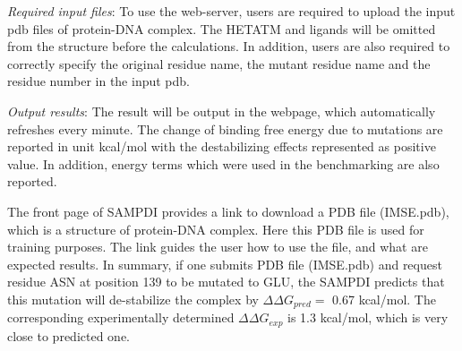 \documentclass[9pt,tutorial,pubversion]{livecoms}
\begin{document}
\textit{Required input files}: To use the web-server, users are required to upload the input pdb files of protein-DNA complex. The HETATM and ligands will be omitted from the structure before the calculations. In addition, users are also required to correctly specify the original residue name, the mutant residue name and the residue number in the input pdb.

\textit{Output results}: The result will be output in the webpage, which automatically refreshes every minute. The change of binding free energy due to mutations are reported in unit kcal/mol with the destabilizing effects represented as positive value. In addition, energy terms which were used in the benchmarking are also reported. 

The front page of SAMPDI provides a link to download a PDB file (IMSE.pdb), which is a structure of protein-DNA complex. Here this PDB file is used for training purposes. The link guides the user how to use the file, and what are expected results. In summary, if one submits PDB file (IMSE.pdb) and request residue ASN at position 139 to be mutated to GLU, the SAMPDI predicts that this mutation will de-stabilize the complex by $ \Delta\Delta G_{pred} =$ 0.67 kcal/mol. The corresponding experimentally determined $ \Delta\Delta G_{exp} $ is 1.3 kcal/mol, which is very close to predicted one.
\end{document}
